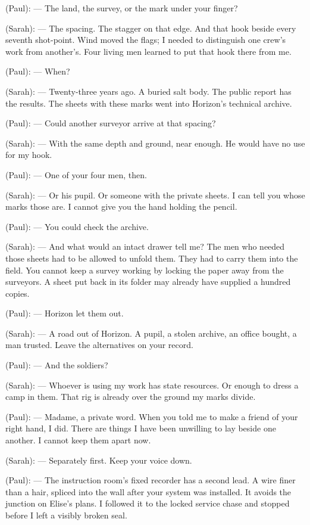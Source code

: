 \begin{room}
\centerline{}

(Paul): --- The land, the survey, or the mark under your finger?

(Sarah): --- The spacing. The stagger on that edge. And that hook beside every seventh shot-point. Wind moved the flags; I needed to distinguish one crew's work from another's. Four living men learned to put that hook there from me.

(Paul): --- When?

(Sarah): --- Twenty-three years ago. A buried salt body. The public report has the results. The sheets with these marks went into Horizon's technical archive.

(Paul): --- Could another surveyor arrive at that spacing?

(Sarah): --- With the same depth and ground, near enough. He would have no use for my hook.

(Paul): --- One of your four men, then.

(Sarah): --- Or his pupil. Or someone with the private sheets. I can tell you whose marks those are. I cannot give you the hand holding the pencil.

(Paul): --- You could check the archive.

(Sarah): --- And what would an intact drawer tell me? The men who needed those sheets had to be allowed to unfold them. They had to carry them into the field. You cannot keep a survey working by locking the paper away from the surveyors. A sheet put back in its folder may already have supplied a hundred copies.

(Paul): --- Horizon let them out.

(Sarah): --- A road out of Horizon. A pupil, a stolen archive, an office bought, a man trusted. Leave the alternatives on your record.

(Paul): --- And the soldiers?

(Sarah): --- Whoever is using my work has state resources. Or enough to dress a camp in them. That rig is already over the ground my marks divide.

\centerline{}

(Paul): --- Madame, a private word. When you told me to make a friend of your right hand, I did. There are things I have been unwilling to lay beside one another. I cannot keep them apart now.

(Sarah): --- Separately first. Keep your voice down.

(Paul): --- The instruction room's fixed recorder has a second lead. A wire finer than a hair, spliced into the wall after your system was installed. It avoids the junction on Elise's plans. I followed it to the locked service chase and stopped before I left a visibly broken seal.


\end{room}
